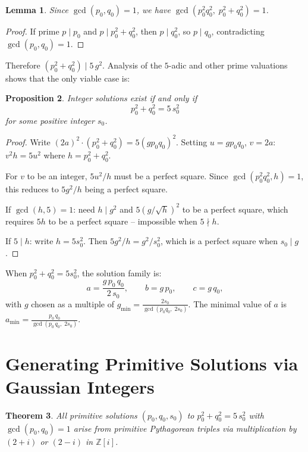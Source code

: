 \documentclass[11pt,a4paper]{article}
\newtheorem{theorem}{Theorem}
\newtheorem{lemma}[theorem]{Lemma}
\newtheorem{proposition}[theorem]{Proposition}
\begin{document}
\begin{lemma}
  Since $\gcd(p_0, q_0) = 1$, we have $\gcd(p_0^2 q_0^2,\; p_0^2 + q_0^2) = 1$.
\end{lemma}
\begin{proof}
  If prime $p \mid p_0$ and $p \mid p_0^2 + q_0^2$, then $p \mid q_0^2$, so $p \mid q_0$,
  contradicting $\gcd(p_0, q_0) = 1$.
\end{proof}

Therefore $(p_0^2 + q_0^2) \mid 5\,g^2$. Analysis of the $5$-adic and other prime
valuations shows that the only viable case is:

\begin{proposition}
  Integer solutions exist if and only if
  \begin{equation}\label{eq:norm}
    p_0^2 + q_0^2 = 5\,s_0^2
  \end{equation}
  for some positive integer $s_0$.
\end{proposition}

\begin{proof}
  Write $(2a)^2 \cdot (p_0^2 + q_0^2) = 5(g p_0 q_0)^2$.
  Setting $u = g p_0 q_0$, $v = 2a$: $v^2 h = 5 u^2$ where $h = p_0^2 + q_0^2$.

  For $v$ to be an integer, $5u^2/h$ must be a perfect square.
  Since $\gcd(p_0^2 q_0^2, h) = 1$, this reduces to $5g^2/h$ being a perfect square.

  If $\gcd(h, 5) = 1$: need $h \mid g^2$ and $5(g/\sqrt{h})^2$ to be a perfect square,
  which requires $5h$ to be a perfect square -- impossible when $5 \nmid h$.

  If $5 \mid h$: write $h = 5s_0^2$. Then $5g^2/h = g^2/s_0^2$, which is a perfect square
  when $s_0 \mid g$.
\end{proof}

When $p_0^2 + q_0^2 = 5s_0^2$, the solution family is:
\[
  a = \frac{g\, p_0\, q_0}{2\, s_0}, \qquad
  b = g\, p_0, \qquad
  c = g\, q_0,
\]
with $g$ chosen as a multiple of $g_{\min} = \frac{2s_0}{\gcd(p_0 q_0,\; 2s_0)}$.
The minimal value of $a$ is
$a_{\min} = \frac{p_0\, q_0}{\gcd(p_0\, q_0,\; 2s_0)}$.

\section{Generating Primitive Solutions via Gaussian Integers}

\begin{theorem}
  All primitive solutions $(p_0, q_0, s_0)$ to $p_0^2 + q_0^2 = 5\,s_0^2$ with
  $\gcd(p_0, q_0) = 1$ arise from primitive Pythagorean triples via multiplication
  by $(2 + i)$ or $(2 - i)$ in $\mathbb{Z}[i]$.
\end{theorem}
\end{document}
